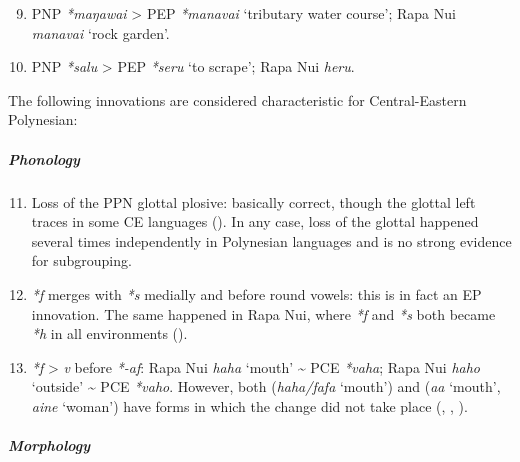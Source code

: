 \begin{enumerate}
\setcounter{enumi}{8}
\item 
PNP \textit{*maŋawai} {\textgreater} PEP \textit{*manavai} ‘tributary water course’; Rapa Nui \textit{manavai} ‘rock garden’.   

\item 
PNP \textit{*salu} {\textgreater} PEP \textit{*seru} ‘to scrape’; Rapa Nui \textit{heru}.   

\end{enumerate}

The following innovations are considered characteristic for Central-Eastern Polynesian:

\subparagraph{Phonology}

\begin{enumerate}
\setcounter{enumi}{10}
\item 
Loss of the PPN glottal plosive: basically correct, though the glottal left traces in some CE languages (\citealt[70–71]{Marck2000}). In any case, loss of the glottal happened several times independently in Polynesian languages and is no strong evidence for subgrouping.   

\item 
\textit{*f} merges with \textit{*s} medially and before round vowels: this is in fact an EP innovation. The same happened in Rapa Nui, where \textit{*f} and \textit{*s} both became \textit{*h} in all environments ().   

\item 
\textit{*f} {\textgreater} \textit{v} before \textit{*-af}: Rapa Nui \textit{haha} ‘mouth’ {\textasciitilde} PCE \textit{*vaha}; Rapa Nui \textit{haho} ‘outside’ {\textasciitilde} PCE \textit{*vaho}. However, both  (\textit{haha/fafa} ‘mouth’) and  (\textit{{\ꞌ}a{\ꞌ}a} ‘mouth’, \textit{{\ꞌ}a{\ꞌ}ine} ‘woman’) have forms in which the change did not take place (\citealt[509]{Elbert1982}, \citealt[351–352]{Wilson2012}, \citealt{Fischer2001Doublets}).   

\end{enumerate}

\subparagraph{Morphology}

